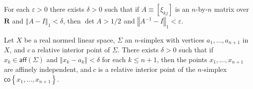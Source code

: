 \documentclass[10pt,a4paper]{amsart}
\begin{document}
\begin{lemma}
\label{sept12l1}For each $\varepsilon>0$ there exists $\delta>0$ such that if
$A\equiv\left[  \xi_{kj}\right]  $ is an $n$-by-$n$ matrix over $\mathbf{R}$
and $\left\Vert A-I\right\Vert _{1}<\delta$, then $\det A>1/2\,\ $and
$\left\Vert A^{-1}-I\right\Vert _{1}<\varepsilon$.
\end{lemma}

\begin{theorem}
\label{sept13t1}Let $X$ be a real normed linear space, $\Sigma$ an $n$-simplex
with vertices $a_{1},\ldots,a_{n+1}$ in $X$, and $c\ $a relative interior
point of $\Sigma$. There exists $\delta>0$ such that if $x_{k}\in
\mathsf{aff}(\Sigma)$ and $\left\Vert x_{k}-a_{k}\right\Vert <\delta$ for each
$k\leq n+1$, then the points $x_{1},\ldots,x_{n+1}$ are affinely independent,
and$\ c$ is a relative interior point of the $n$-simplex $\mathsf{co}\left\{
x_{1},\ldots,x_{n+1}\right\}  $.
\end{theorem}
\end{document}
